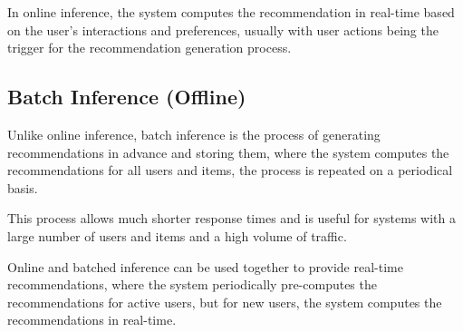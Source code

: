 In online inference, the system computes the recommendation in real-time based on the user's interactions and preferences, usually with user actions being the trigger for the recommendation generation process.

\subsection*{Batch Inference (Offline)}
Unlike online inference, batch inference is the process of generating recommendations in advance and storing them, 
where the system computes the recommendations for all users and items, 
the process is repeated on a periodical basis.\cite{NvidiaOfflineToOnline}

This process allows much shorter response times and is useful for systems with a large number of users and items and a high volume of traffic.

Online and batched inference can be used together to provide real-time recommendations, where the system periodically pre-computes the recommendations for active users, but for new users, the system computes the recommendations in real-time.

